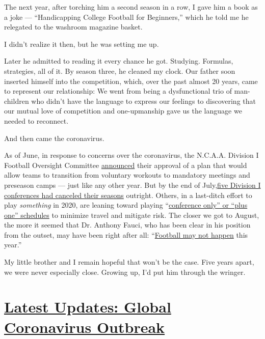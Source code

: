 The next year, after torching him a second season in a row, I gave him a
book as a joke --- ``Handicapping College Football for Beginners,''
which he told me he relegated to the washroom magazine basket.

I didn't realize it then, but he was setting me up.

Later he admitted to reading it every chance he got. Studying. Formulas,
strategies, all of it. By season three, he cleaned my clock. Our father
soon inserted himself into the competition, which, over the past almost
20 years, came to represent our relationship: We went from being a
dysfunctional trio of man-children who didn't have the language to
express our feelings to discovering that our mutual love of competition
and one-upmanship gave us the language we needed to reconnect.

And then came the coronavirus.

As of June, in response to concerns over the coronavirus, the N.C.A.A.
Division I Football Oversight Committee
\href{https://www.espn.com/college-football/story/_/id/29325130/ncaa-division-council-approves-six-week-practice-plan-football}{announced}
their approval of a plan that would allow teams to transition from
voluntary workouts to mandatory meetings and preseason camps --- just
like any other year. But by the end of
July,\href{https://www.sportingnews.com/us/ncaa-football/news/covid-19-college-football-conferences-canceled-season-2020/19mroowdygu9z1tv54mul2vxgw}{five
Division I conferences had canceled their seasons} outright. Others, in
a last-ditch effort to play \emph{something} in 2020, are leaning toward
playing
``\href{https://www.cbssports.com/college-football/news/sec-acc-big-12-considering-plus-one-scheduling-model-with-shortened-2020-season-becoming-an-inevitability/}{conference
only'' or ``plus one'' schedules} to minimize travel and mitigate risk.
The closer we got to August, the more it seemed that Dr. Anthony Fauci,
who has been clear in his position from the outset, may have been right
after all:
``\href{https://www.cnn.com/2020/06/18/us/football-happen-fauci-spt-trnd/index.html}{Football
may not happen} this year.''

My little brother and I remain hopeful that won't be the case. Five
years apart, we were never especially close. Growing up, I'd put him
through the wringer.

\hypertarget{latest-updates-global-coronavirus-outbreak}{%
\section{\texorpdfstring{\href{https://www.nytimes3xbfgragh.onion/2020/08/01/world/coronavirus-covid-19.html?action=click\&pgtype=Article\&state=default\&region=MAIN_CONTENT_1\&context=storylines_live_updates}{Latest
Updates: Global Coronavirus
Outbreak}}{Latest Updates: Global Coronavirus Outbreak}}\label{latest-updates-global-coronavirus-outbreak}}

